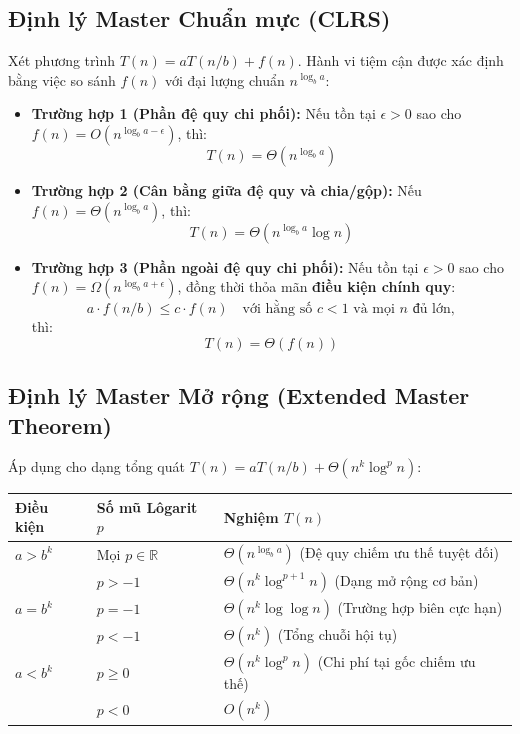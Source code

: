 \documentclass[11pt,a4paper]{article}
\begin{document}
\subsection{Định lý Master Chuẩn mực (CLRS)}

\begin{theorembox}
Xét phương trình $T(n) = a T(n/b) + f(n)$. Hành vi tiệm cận được xác định bằng việc so sánh $f(n)$ với đại lượng chuẩn $n^{\log_b a}$:

\begin{itemize}[leftmargin=1.5em, itemsep=4pt]
    \item \textbf{Trường hợp 1 (Phần đệ quy chi phối):}
    Nếu tồn tại $\epsilon > 0$ sao cho $f(n) = O\left(n^{\log_b a - \epsilon}\right)$, thì:
    \[
    T(n) = \Theta\left(n^{\log_b a}\right)
    \]

    \item \textbf{Trường hợp 2 (Cân bằng giữa đệ quy và chia/gộp):}
    Nếu $f(n) = \Theta\left(n^{\log_b a}\right)$, thì:
    \[
    T(n) = \Theta\left(n^{\log_b a} \log n\right)
    \]

    \item \textbf{Trường hợp 3 (Phần ngoài đệ quy chi phối):}
    Nếu tồn tại $\epsilon > 0$ sao cho $f(n) = \Omega\left(n^{\log_b a + \epsilon}\right)$, đồng thời thỏa mãn \textbf{điều kiện chính quy}:
    \[
    a \cdot f(n/b) \le c \cdot f(n) \quad \text{với hằng số } c < 1 \text{ và mọi } n \text{ đủ lớn},
    \]
    thì:
    \[
    T(n) = \Theta(f(n))
    \]
\end{itemize}
\end{theorembox}

\subsection{Định lý Master Mở rộng (Extended Master Theorem)}
Áp dụng cho dạng tổng quát $T(n) = a T(n/b) + \Theta(n^k \log^p n)$:
\begin{center}
\begin{tabularx}{\textwidth}{l l X}
\toprule
\textbf{Điều kiện} & \textbf{Số mũ Lôgarit $p$} & \textbf{Nghiệm $T(n)$} \\
\midrule
$a > b^k$ & Mọi $p \in \mathbb{R}$ & $\Theta\left(n^{\log_b a}\right)$ \hfill (Đệ quy chiếm ưu thế tuyệt đối) \\
\midrule
\multirow{3}{*}{$a = b^k$} & $p > -1$ & $\Theta\left(n^k \log^{p+1} n\right)$ \hfill (Dạng mở rộng cơ bản) \\
& $p = -1$ & $\Theta\left(n^k \log \log n\right)$ \hfill (Trường hợp biên cực hạn) \\
& $p < -1$ & $\Theta\left(n^k\right)$ \hfill (Tổng chuỗi hội tụ) \\
\midrule
$a < b^k$ & $p \ge 0$ & $\Theta\left(n^k \log^p n\right)$ \hfill (Chi phí tại gốc chiếm ưu thế) \\
& $p < 0$ & $O\left(n^k\right)$ \\
\bottomrule
\end{tabularx}
\end{center}
\end{document}
